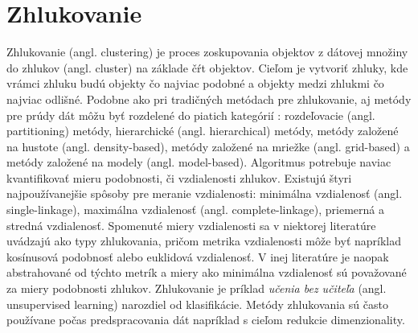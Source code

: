 

\section{Zhlukovanie}
Zhlukovanie (angl. clustering) je proces zoskupovania objektov z dátovej množiny do zhlukov (angl. cluster) na základe čŕt objektov. Cieľom je vytvoriť zhluky, kde vrámci zhluku budú objekty čo najviac podobné a objekty medzi zhlukmi čo najviac odlišné. Podobne ako pri tradičných metódach pre zhlukovanie, aj metódy pre prúdy dát môžu byť rozdelené do piatich kategórií \citep{nguyen2015survey, aggarwal2014survey}: rozdeľovacie (angl. partitioning) metódy, hierarchické (angl. hierarchical) metódy, metódy založené na hustote (angl. density-based), metódy založené na mriežke (angl. grid-based) a metódy založené na modely (angl. model-based). Algoritmus potrebuje naviac kvantifikovať mieru podobnosti, či vzdialenosti zhlukov. Existujú štyri najpoužívanejšie spôsoby pre meranie vzdialenosti: minimálna vzdialenosť (angl. single-linkage), maximálna vzdialenosť (angl. complete-linkage), priemerná a stredná vzdialenosť. Spomenuté miery vzdialenosti sa v niektorej literatúre uvádzajú ako typy zhlukovania, pričom metrika vzdialenosti môže byť napríklad kosínusová podobnosť alebo euklidová vzdialenosť. V inej literatúre je naopak abstrahované od týchto metrík a miery ako minimálna vzdialenosť sú považované za miery podobnosti zhlukov. Zhlukovanie je príklad \textit{učenia bez učiteľa} (angl. unsupervised learning) narozdiel od klasifikácie. Metódy zhlukovania sú často používane počas predspracovania dát napríklad s cieľom redukcie dimenzionality.

